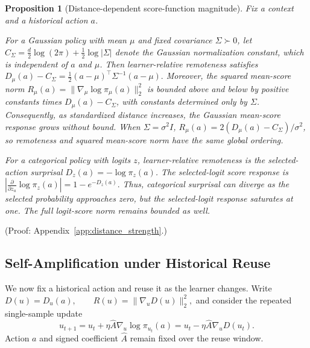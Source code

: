 \documentclass{article}
\theoremstyle{plain}
\newtheorem{proposition}[theorem]{Proposition}
\theoremstyle{definition}
\theoremstyle{remark}
\begin{document}
\begin{proposition}[Distance-dependent score-function magnitude]
\label{prop:distance_strength}
Fix a context and a historical action \(a\).

For a Gaussian policy with mean \(\mu\) and fixed covariance
\(\Sigma\succ0\), let
\(C_\Sigma=\frac{d}{2}\log(2\pi)+\frac12\log|\Sigma|\) denote the
Gaussian normalization constant, which is independent of \(a\) and
\(\mu\). Then learner-relative remoteness satisfies
\(
    D_\mu(a)-C_\Sigma
    =
    \frac12
    (a-\mu)^\top\Sigma^{-1}(a-\mu).
\)
Moreover, the squared mean-score norm
\(R_\mu(a)=\|\nabla_\mu\log\pi_\mu(a)\|_2^2\) is bounded above and below
by positive constants times \(D_\mu(a)-C_\Sigma\), with constants
determined only by \(\Sigma\). Consequently, as standardized distance
increases, the Gaussian mean-score response grows without bound. When
\(\Sigma=\sigma^2I\), \(R_\mu(a)=2(D_\mu(a)-C_\Sigma)/\sigma^2\), so
remoteness and squared mean-score norm have the same global ordering.

For a categorical policy with logits \(z\), learner-relative remoteness is
the selected-action surprisal \(D_z(a)=-\log\pi_z(a)\). The selected-logit
score response is
\(
    \left|
    \frac{\partial}{\partial z_a}
    \log \pi_z(a)
    \right|
    =
    1-e^{-D_z(a)}.
\)
Thus, categorical surprisal can diverge as the selected probability
approaches zero, but the selected-logit response saturates at one. The
full logit-score norm remains bounded as well.
\end{proposition}

(Proof: Appendix~\ref{app:distance_strength}.)


\subsection{Self-Amplification under Historical Reuse}
\label{sec:self_amplification}

We now fix a historical action and reuse it as the learner changes. Write
\(
    D(u)=D_u(a),
    \qquad
    R(u)=\|\nabla_uD(u)\|_2^2,
\)
and consider the repeated single-sample update
\begin{equation}
    u_{t+1}
    =
    u_t
    +
    \eta\widehat A\nabla_u\log\pi_{u_t}(a)
    =
    u_t
    -
    \eta\widehat A\nabla_uD(u_t).
    \label{eq:single_sample_reuse_update}
\end{equation}
Action \(a\) and signed coefficient \(\widehat A\) remain fixed over the
reuse window.
\end{document}
